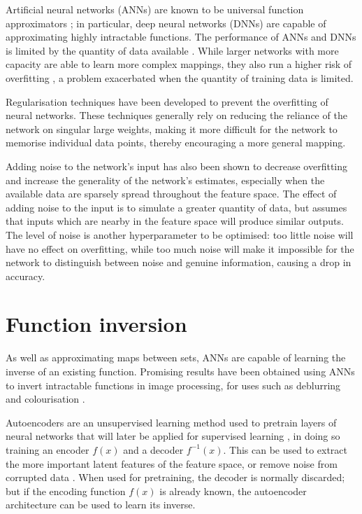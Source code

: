 \documentclass[../../main.tex]{subfiles}
\begin{document}
Artificial neural networks (ANNs) are known to be universal function approximators \cite{hornik91}; in particular, deep neural networks (DNNs) \cite{liang17} are capable of approximating highly intractable functions.
The performance of ANNs and DNNs is limited by the quantity of data available \cite{raudys91}.
While larger networks with more capacity are able to learn more complex mappings, they also run a higher risk of overfitting \cite{caruana01}, a problem exacerbated when the quantity of training data is limited.

Regularisation techniques have been developed \cite{goodfellow16, srivastava14, ioffe15, li18} to prevent the overfitting of neural networks.
These techniques generally rely on reducing the reliance of the network on singular large weights, making it more difficult for the network to memorise individual data points, thereby encouraging a more general mapping.

Adding noise to the network's input \cite{zur09} has also been shown to decrease overfitting and increase the generality of the network's estimates, especially when the available data are sparsely spread throughout the feature space.
The effect of adding noise to the input is to simulate a greater quantity of data, but assumes that inputs which are nearby in the feature space will produce similar outputs.
The level of noise is another hyperparameter to be optimised: too little noise will have no effect on overfitting, while too much noise will make it impossible for the network to distinguish between noise and genuine information, causing a drop in accuracy.

\section{Function inversion} \label{section:functionInversion}

As well as approximating maps between sets, ANNs are capable of learning the inverse of an existing function.
Promising results have been obtained using ANNs to invert intractable functions in image processing, for uses such as deblurring \cite{nah18} and colourisation \cite{nguyen16}.

Autoencoders are an unsupervised learning method used to pretrain layers of neural networks that will later be applied for supervised learning \cite{rumelhart86}, in doing so training an encoder $f(x)$ and a decoder $f^{-1}(x)$.
This can be used to extract the more important latent features of the feature space, or remove noise from corrupted data \cite{vincent08}.
When used for pretraining, the decoder is normally discarded; but if the encoding function $f(x)$ is already known, the autoencoder architecture can be used to learn its inverse.
\end{document}
